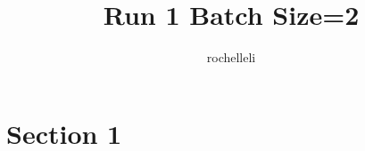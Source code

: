 \documentclass{article}
\title{Run 1 Batch Size=2}
\author{%
rochelleli
}
\begin{document}
\maketitle

\section{Section 1}

\nocite{*}


\end{document}
